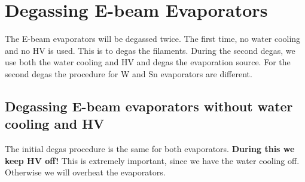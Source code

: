 \section{Degassing E-beam Evaporators}
The E-beam evaporators will be degassed twice. The first time, no water cooling and no HV is used. This is to degas the filaments. During the second degas, we use both the water cooling and HV and degas the evaporation source. For the second degas the procedure for W and Sn evaporators are different.
\subsection{Degassing E-beam evaporators without water cooling and HV}
The initial degas procedure is the same for both  evaporators. \textbf{During this we keep HV off!} This is extremely important, since we have the water cooling off. Otherwise we will overheat the evaporators.
